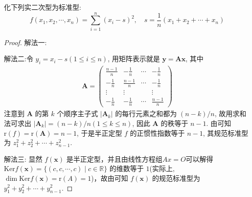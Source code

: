 \documentclass[../../main.tex]{subfiles}
\begin{document}
\begin{example}\label{example:例8.34}
化下列实二次型为标准型:
\[f(x_1,x_2,\cdots,x_n)=\sum_{i = 1}^{n}(x_i - s)^2, \quad s = \frac{1}{n}(x_1 + x_2 + \cdots + x_n)\]
\end{example}
\begin{proof}
{\color{blue}解法一:}

{\color{blue}解法二:}令 \(y_i = x_i - s(1\leq i\leq n)\), 用矩阵表示就是 \(\boldsymbol{y} = \boldsymbol{A}\boldsymbol{x}\), 其中
\begin{align*}
\boldsymbol{A} = \begin{pmatrix}
\frac{n - 1}{n} & -\frac{1}{n} & \cdots & -\frac{1}{n} \\
-\frac{1}{n} & \frac{n - 1}{n} & \cdots & -\frac{1}{n} \\
\vdots & \vdots & & \vdots \\
-\frac{1}{n} & -\frac{1}{n} & \cdots & \frac{n - 1}{n}
\end{pmatrix}
\end{align*}
注意到 \(\boldsymbol{A}\) 的第 \(k\) 个顺序主子式 \(|\boldsymbol{A}_k|\) 的每行元素之和都为 \((n - k)/n\), 故用求和法可求出 \(|\boldsymbol{A}_k| = (n - k)/n(1\leq k\leq n)\), 因此 \(\boldsymbol{A}\) 的秩等于 \(n - 1\). 由可知 \(\mathrm{r}(f)=\mathrm{r}(\boldsymbol{A}) = n - 1\), 于是半正定型 \(f\) 的正惯性指数等于 \(n - 1\), 其规范标准型为 \(z_1^2 + z_2^2 + \cdots + z_{n - 1}^2\).

{\color{blue}解法三:}
显然 $f(\boldsymbol{x})$ 是半正定型，并且由线性方程组$Ax=O$可以解得 $\mathrm{Ker} f(\boldsymbol{x})=\{(c,c,\cdots,c)\mid c\in\mathbb{R}\}$ 的维数等于 $1$(实际上,$\dim \mathrm{Ker} f(\boldsymbol{x})=\mathrm{r}(A)=1$)，故由可知 $f(\boldsymbol{x})$ 的规范标准型为 $y_1^2 + y_2^2+\cdots + y_{n - 1}^2$.  
\end{proof}
\end{document}
